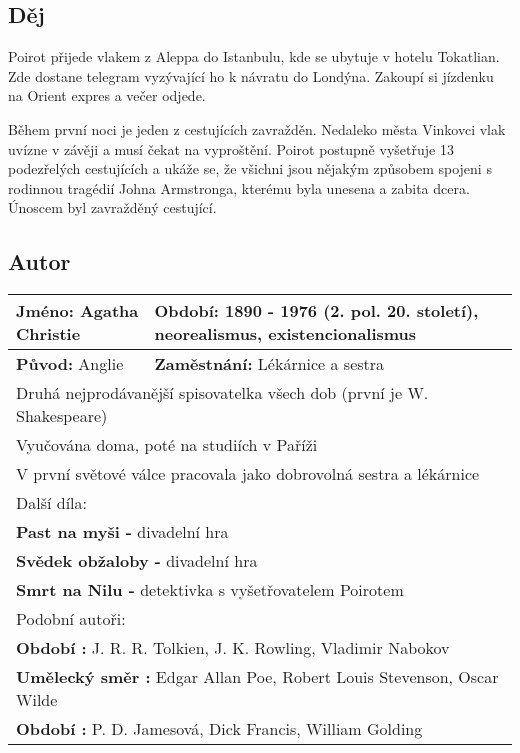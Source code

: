 \subsection*{Děj}
Poirot přijede vlakem z Aleppa do Istanbulu, kde se ubytuje v hotelu Tokatlian.
Zde dostane telegram vyzývající ho k návratu do Londýna.
Zakoupí si jízdenku na Orient expres a večer odjede.

Během první noci je jeden z cestujících zavražděn.
Nedaleko města Vinkovci vlak uvízne v závěji a musí čekat na vyproštění.
Poirot postupně vyšetřuje 13 podezřelých cestujících a ukáže se, že všichni jsou nějakým způsobem spojeni s rodinnou tragédií Johna Armstronga, kterému byla unesena a zabita dcera.
Únoscem byl zavražděný cestující.

\subsection*{Autor}
\begin{tabularx}{\linewidth}{l|l}
    \textbf{Jméno:} Agatha Christie & \textbf{Období:} 1890 - 1976 (2. pol. 20. století), neorealismus, existencionalismus \\
    \hline
    \textbf{Původ:} Anglie          & \textbf{Zaměstnání:} Lékárnice a sestra                                                 \\
    \hline
    \multicolumn{2}{l}{Druhá nejprodávanější spisovatelka všech dob (první je W. Shakespeare)}                                \\
    \multicolumn{2}{l}{Vyučována doma, poté na studiích v Paříži}                                                             \\
    \multicolumn{2}{l}{V první světové válce pracovala jako dobrovolná sestra a lékárnice}                                    \\
    \hline
    \multicolumn{2}{l}{Další díla:}                                                                                           \\
    \multicolumn{2}{l}{\textbf{Past na myši -} divadelní hra}                                                                 \\
    \multicolumn{2}{l}{\textbf{Svědek obžaloby -} divadelní hra}                                                              \\
    \multicolumn{2}{l}{\textbf{Smrt na Nilu -} detektivka s vyšetřovatelem Poirotem}                                          \\
    \hline
    \multicolumn{2}{l}{Podobní autoři:}                                                                                       \\
    \multicolumn{2}{l}{\textbf{Období :} J. R. R. Tolkien, J. K. Rowling, Vladimir Nabokov}                                   \\
    \multicolumn{2}{l}{\textbf{Umělecký směr :} Edgar Allan Poe, Robert Louis Stevenson, Oscar Wilde}                         \\
    \multicolumn{2}{l}{\textbf{Období :} P. D. Jamesová, Dick Francis, William Golding}                                                     \\
\end{tabularx}
